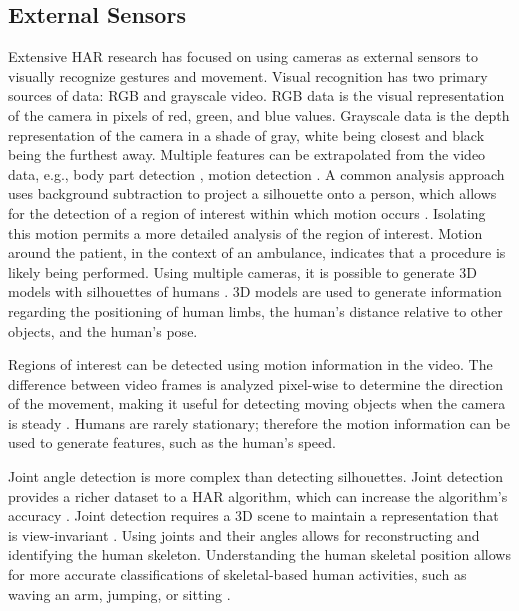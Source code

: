 \subsection{External Sensors}
Extensive \gls{HAR} research has focused on using cameras as external sensors to visually recognize gestures and movement. Visual recognition has two primary sources of data: RGB and grayscale video. RGB data is the visual representation of the camera in pixels of red, green, and blue values. Grayscale data is the depth representation of the camera in a shade of gray, white being closest and black being the furthest away. Multiple features can be extrapolated from the video data, e.g., body part detection \cite{Chakraborty2008}, motion detection \cite{4813430}. A common analysis approach uses background subtraction to project a silhouette onto a person, which allows for the detection of a region of interest within which motion occurs \cite{Bobick2001}. Isolating this motion permits a more detailed analysis of the region of interest. Motion around the patient, in the context of an ambulance, indicates that a procedure is likely being performed. Using multiple cameras, it is possible to generate 3D models with silhouettes of humans \cite{Weinland2006}. 3D models are used to generate information regarding the positioning of human limbs, the human's distance relative to other objects, and the human's pose.
\par Regions of interest can be detected using motion information in the video. The difference between video frames is analyzed pixel-wise to determine the direction of the movement, making it useful for detecting moving objects when the camera is steady \cite{Efros03}. Humans are rarely stationary; therefore the motion information can be used to generate features, such as the human's speed.
\par Joint angle detection is more complex than detecting silhouettes. Joint detection provides a richer dataset to a HAR algorithm, which can increase the algorithm’s accuracy \cite{CGV-005}. Joint detection requires a 3D scene to maintain a representation that is view-invariant \cite{Poppe2010}. Using joints and their angles allows for reconstructing and identifying the human skeleton. Understanding the human skeletal position allows for more accurate classifications of skeletal-based human activities, such as waving an arm, jumping, or sitting \cite{HsuanSheng}.


